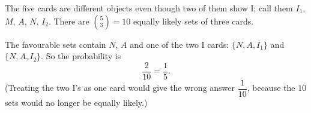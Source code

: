 The five cards are different objects even though two of them show I; call them $I_1$, $M$, $A$, $N$, $I_2$. There are $\binom53=10$ equally likely sets of three cards.

The favourable sets contain $N$, $A$ and one of the two I cards: $\{N,A,I_1\}$ and $\{N,A,I_2\}$. So the probability is
\[
\dfrac{2}{10}=\boxed{\dfrac{1}{5}}.
\]
(Treating the two I's as one card would give the wrong answer $\dfrac{1}{10}$, because the $10$ sets would no longer be equally likely.)
